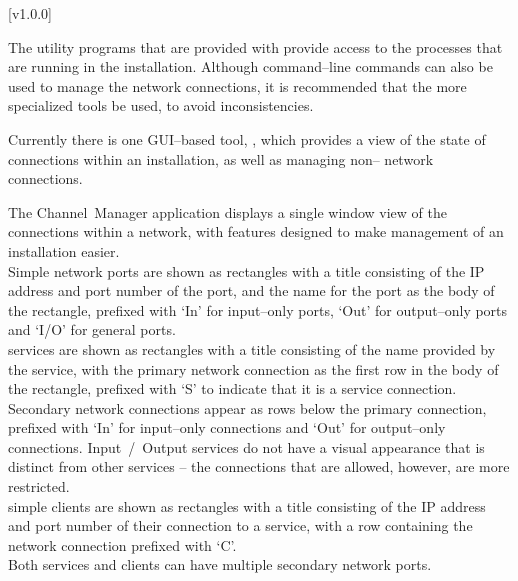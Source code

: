 [v1.0.0]

The utility programs that are provided with \mplusm{} provide access to the processes that
are running in the \mplusm{} installation.
Although command--line \yarp{} commands can also be used to manage the network
connections, it is recommended that the more specialized \mplusm{} tools be used, to avoid
inconsistencies.


Currently there is one GUI--based tool, ,
which provides a view of the state of connections within an \mplusm{} installation, as
well as managing non--\mplusm{} \yarp{} network connections.


The Channel~Manager application displays a single window view of the connections within a
\yarp{} network, with features designed to make management of an \mplusm{} installation
easier.\\

Simple \yarp{} network ports are shown as rectangles with a title consisting of the IP
address and port number of the port, and the \yarp{} name for the port as the body of the
rectangle, prefixed with `In' for input--only ports, `Out' for output--only ports and
`I/O' for general ports.\\

\mplusm{} services are shown as rectangles with a title consisting of the name provided by
the service, with the primary \yarp{} network connection as the first row in the body of
the rectangle, prefixed with `S' to indicate that it is a service connection.
Secondary \yarp{} network connections appear as rows below the primary connection,
prefixed with `In' for input--only connections and `Out' for output--only connections.
\mplusm{} Input~/~Output services do not have a visual appearance that is distinct from
other \mplusm{} services -- the connections that are allowed, however, are more
restricted.\\

\mplusm{} simple clients are shown as rectangles with a title consisting of the IP address
and port number of their connection to a service, with a row containing the \yarp{}
network connection prefixed with `C'.\\

Both \mplusm{} services and clients can have multiple secondary \yarp{} network ports.\\

